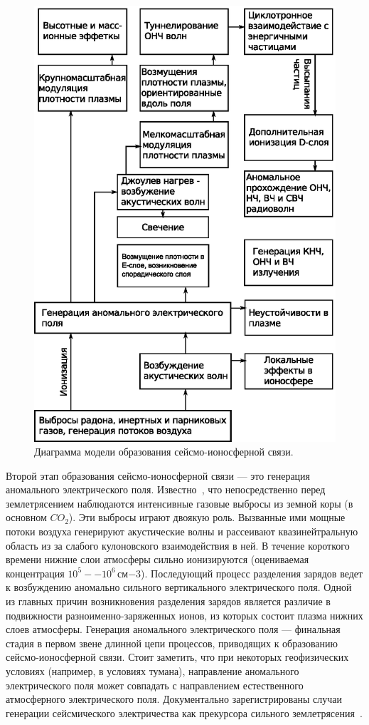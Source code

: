 \documentclass[12pt, oneside, a4paper]{article}
\begin{document}
\begin{figure}[H]
    \centering
    \includegraphics*[width=0.8\columnwidth]{process-chain}
    \caption{Диаграмма модели образования сейсмо-ионосферной связи.}
    \label{fig:process-chain}
\end{figure}

Второй этап образования сейсмо-ионосферной связи --- это генерация аномального электрического поля. Известно~\cite{Voitov_Dobrovolsky:1994}, что непосредственно перед землетрясением наблюдаются интенсивные газовые выбросы из земной коры (в основном $CO_2$). Эти выбросы играют двоякую роль. Вызванные ими мощные потоки воздуха генерируют акустические волны и рассеивают квазинейтральную область из за слабого кулоновского взаимодействия в ней. В  течение короткого времени нижние слои атмосферы сильно ионизируются (оцениваемая концентрация $10^5--10^6$\,см$-3$). Последующий процесс разделения зарядов ведет к возбуждению аномально сильного вертикального электрического поля. Одной из главных причин возникновения разделения зарядов является различие в подвижности разноименно-заряженных ионов, из которых состоит плазма нижних слоев атмосферы. Генерация аномального электрического поля --- финальная стадия в первом звене длинной цепи процессов, приводящих к образованию сейсмо-ионосферной связи. Стоит заметить, что при некоторых геофизических условиях (например, в условиях тумана), направление аномального электрического поля может совпадать с направлением естественного атмосферного электрического поля. Документально зарегистрированы случаи генерации сейсмического электричества как прекурсора сильного землетрясения~\cite{Jianguo:1989,Vershinin:1999}.
\end{document}
